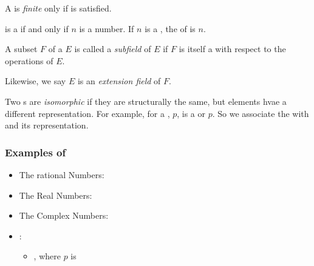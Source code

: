 \begin{definition}\label{def:Finite_Field}
  A  is \emph{finite} only if  is satisfied.
\end{definition}

\begin{theorem}\label{thm:Finite_Field}
  \TextIntsModN{} is a  if and only if $n$ is a  number.
  If $n$ is a , the  of \TextIntsModN{} is $n$.
\end{theorem}

\begin{definition}[Subfield]\label{def:Subfield}
  A subset $F$ of a  $E$ is called a \emph{subfield} of $E$ if $F$ is itself a  with respect to the operations of $E$.
  
  \begin{remark}\label{rmk:Extension_Field}
    Likewise, we say $E$ is an \emph{extension field} of $F$.
  \end{remark}
\end{definition}

\begin{definition}[Isomorphism]\label{def:Isomorphism}
  Two s are \emph{isomorphic} if they are structurally the same, but elements hvae a different representation.
  For example, for a , $p$,  is a  or  $p$.
  So we associate the   with  and its representation.
\end{definition}

\subsubsection{Examples of }\label{subsubsec:Examples_of_Fields}
\begin{itemize}[noitemsep]
\item The rational Numbers: \TextRationalNumbers{}
\item The Real Numbers: \TextRealNumbers{}
\item The Complex Numbers: \TextComplexNumbers{}
\item {}:
  \begin{itemize}[noitemsep]
  \item {}, where $p$ is 
  \end{itemize}
\end{itemize}

